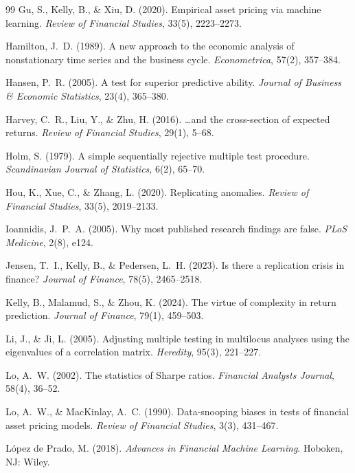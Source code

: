 \documentclass[11pt]{article}
\begin{document}
\begin{thebibliography}{99}
Gu, S., Kelly, B., \& Xiu, D. (2020). Empirical asset pricing via machine learning. \emph{Review of Financial Studies}, 33(5), 2223--2273.

Hamilton, J.~D. (1989). A new approach to the economic analysis of nonstationary time series and the business cycle. \emph{Econometrica}, 57(2), 357--384.

Hansen, P.~R. (2005). A test for superior predictive ability. \emph{Journal of Business \& Economic Statistics}, 23(4), 365--380.

Harvey, C.~R., Liu, Y., \& Zhu, H. (2016). \ldots and the cross-section of expected returns. \emph{Review of Financial Studies}, 29(1), 5--68.

Holm, S. (1979). A simple sequentially rejective multiple test procedure. \emph{Scandinavian Journal of Statistics}, 6(2), 65--70.

Hou, K., Xue, C., \& Zhang, L. (2020). Replicating anomalies. \emph{Review of Financial Studies}, 33(5), 2019--2133.

Ioannidis, J.~P.~A. (2005). Why most published research findings are false. \emph{PLoS Medicine}, 2(8), e124.

Jensen, T.~I., Kelly, B., \& Pedersen, L.~H. (2023). Is there a replication crisis in finance? \emph{Journal of Finance}, 78(5), 2465--2518.

Kelly, B., Malamud, S., \& Zhou, K. (2024). The virtue of complexity in return prediction. \emph{Journal of Finance}, 79(1), 459--503.

Li, J., \& Ji, L. (2005). Adjusting multiple testing in multilocus analyses using the eigenvalues of a correlation matrix. \emph{Heredity}, 95(3), 221--227.

Lo, A.~W. (2002). The statistics of Sharpe ratios. \emph{Financial Analysts Journal}, 58(4), 36--52.

Lo, A.~W., \& MacKinlay, A.~C. (1990). Data-snooping biases in tests of financial asset pricing models. \emph{Review of Financial Studies}, 3(3), 431--467.

L\'opez de Prado, M. (2018). \emph{Advances in Financial Machine Learning}. Hoboken, NJ: Wiley.


\end{thebibliography}
\end{document}
